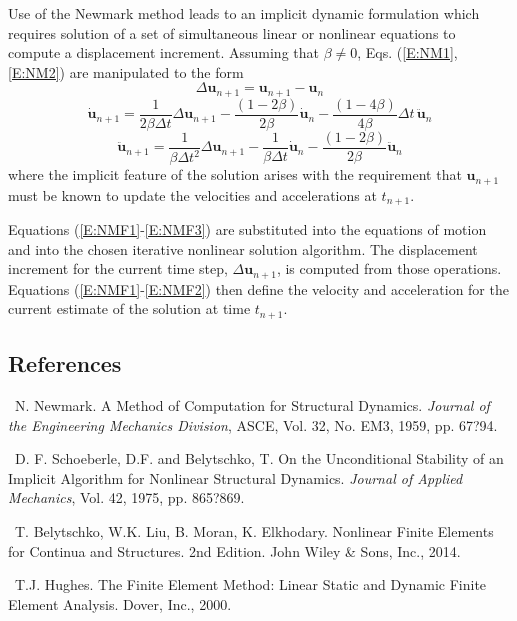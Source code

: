 \documentclass[11pt]{report}
\numberwithin{equation}{section}
\newcommand{\ti}{\emph}
\newcounter{sectrefs}
\begin{document}
Use of the Newmark method leads to an implicit dynamic formulation which requires solution of a
set of simultaneous linear or nonlinear equations to compute a displacement increment. 
Assuming that $\beta\neq 0$, Eqs. (\ref{E:NM1}, \ref{E:NM2}) are manipulated to the form
%
\begin{equation}\label{E:NMF1}
\Delta \bm{u}_{n+1} = \bm{u}_{n+1} - \bm{u}_n
\end{equation}
%
\begin{equation}\label{E:NMF2}
\dot{\bm{u}}_{n+1} = \frac{1}{2\beta \Delta t}\Delta \bm{u}_{n+1} -
\frac{(1-2\beta)}{2\beta}\dot{\bm{u}}_n -
\frac{(1-4\beta)}{4\beta}\Delta t \,\ddot{\bm{u}}_n 
\end{equation}
%
\begin{equation}\label{E:NMF3}
\ddot{\bm{u}}_{n+1} = \frac{1}{\beta \Delta t^2}\Delta \bm{u}_{n+1} -
\frac{1}{\beta\Delta t}\dot{\bm{u}}_n -
\frac{(1-2\beta)}{2\beta}\ddot{\bm{u}}_n 
\end{equation}
\noindent where the implicit feature of the solution arises with the requirement
that $\bm{u}_{n+1}$ must be known to update the velocities and accelerations at
$t_{n+1}$.

Equations (\ref{E:NMF1}-\ref{E:NMF3}) are substituted into the equations of 
motion and into the 
chosen iterative nonlinear solution algorithm. The displacement 
increment for the current time step, $\Delta \bm{u}_{n+1}$, is computed from those
operations. Equations (\ref{E:NMF1}-\ref{E:NMF2}) then define the 
velocity and acceleration for the current estimate of the solution at time $t_{n+1}$. 

\subsection {References}
\small

~N. Newmark. A Method of 
Computation for Structural Dynamics. \ti{Journal of the Engineering Mechanics Division}, ASCE, Vol. 32, 
No. EM3, 1959, pp. 67?94.

\medskip
{}~D. F. Schoeberle, D.F. and Belytschko, T.
On the Unconditional Stability of an Implicit Algorithm for Nonlinear Structural Dynamics.
\ti{Journal of Applied Mechanics}, Vol. 42, 1975, pp. 865?869.

\medskip
{}~T. Belytschko, W.K. Liu, B. Moran, K. Elkhodary.
Nonlinear Finite Elements for Continua and Structures. 2nd Edition. John Wiley \& Sons, Inc., 2014.

\medskip
{}~T.J. Hughes.
The Finite Element Method: Linear Static and Dynamic Finite Element Analysis. Dover, Inc., 2000.
\end{document}
